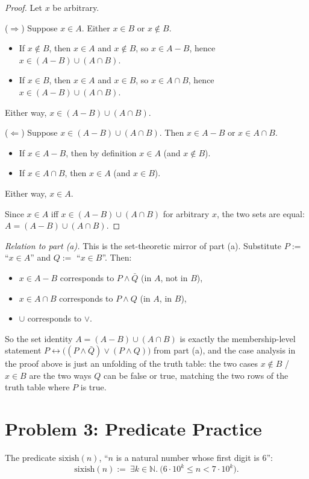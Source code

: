 \documentclass[11pt]{article}
\newcommand{\N}{\mathbb{N}}
\newcommand{\sixish}{\mathrm{sixish}}
\newcommand{\partlabel}[1]{%
    \noindent\makebox[2em][l]{\textbf{(#1)}}%
}
\begin{document}
\begin{proof}
Let $x$ be arbitrary.

($\Rightarrow$) Suppose $x \in A$. Either $x \in B$ or $x \notin B$.
\begin{itemize}
\item If $x \notin B$, then $x \in A$ and $x \notin B$, so $x \in A - B$, hence $x \in (A-B)\cup(A\cap B)$.
\item If $x \in B$, then $x \in A$ and $x \in B$, so $x \in A \cap B$, hence $x \in (A-B)\cup(A\cap B)$.
\end{itemize}
Either way, $x \in (A-B)\cup(A\cap B)$.

($\Leftarrow$) Suppose $x \in (A-B)\cup(A\cap B)$. Then $x \in A-B$ or $x \in A \cap B$.
\begin{itemize}
\item If $x \in A - B$, then by definition $x \in A$ (and $x \notin B$).
\item If $x \in A \cap B$, then $x \in A$ (and $x \in B$).
\end{itemize}
Either way, $x \in A$.

Since $x \in A$ iff $x \in (A-B)\cup(A\cap B)$ for arbitrary $x$, the two sets are equal: $A = (A-B)\cup(A\cap B)$.
\end{proof}

\emph{Relation to part (a).} This is the set-theoretic mirror of part (a). Substitute $P := $ ``$x \in A$'' and $Q := $ ``$x \in B$''. Then:
\begin{itemize}
\item $x \in A - B$ corresponds to $P \wedge \bar Q$ (in $A$, not in $B$),
\item $x \in A \cap B$ corresponds to $P \wedge Q$ (in $A$, in $B$),
\item $\cup$ corresponds to $\vee$.
\end{itemize}
So the set identity $A = (A-B)\cup(A\cap B)$ is exactly the membership-level statement $P \leftrightarrow \big((P\wedge \bar Q)\vee(P\wedge Q)\big)$ from part (a), and the case analysis in the proof above is just an unfolding of the truth table: the two cases $x\notin B$ / $x\in B$ are the two ways $Q$ can be false or true, matching the two rows of the truth table where $P$ is true.

\newpage
\section*{Problem 3: Predicate Practice}

\partlabel{a}
The predicate $\sixish(n)$, ``$n$ is a natural number whose first digit is $6$'':
\[
\sixish(n) :=\ \exists k \in \N.\ \big(6\cdot 10^{k} \le n < 7 \cdot 10^{k}\big).
\]
\end{document}
